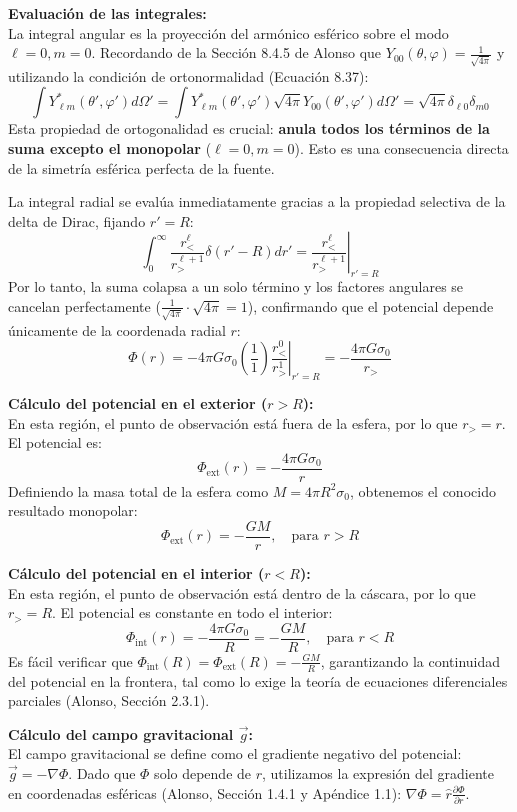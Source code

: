 \documentclass[a4paper]{article}
\begin{document}
\textbf{Evaluación de las integrales:} \\
La integral angular es la proyección del armónico esférico sobre el modo $\ell=0, m=0$. Recordando de la Sección 8.4.5 de Alonso que $Y_{00}(\theta, \varphi) = \frac{1}{\sqrt{4\pi}}$ y utilizando la condición de ortonormalidad (Ecuación 8.37):
$$
\int Y_{\ell m}^*(\theta', \varphi') d\Omega' = \int Y_{\ell m}^*(\theta', \varphi') \sqrt{4\pi} Y_{00}(\theta', \varphi') d\Omega' = \sqrt{4\pi} \delta_{\ell 0} \delta_{m 0}
$$
Esta propiedad de ortogonalidad es crucial: \textbf{anula todos los términos de la suma excepto el monopolar} ($\ell=0, m=0$). Esto es una consecuencia directa de la simetría esférica perfecta de la fuente. 

La integral radial se evalúa inmediatamente gracias a la propiedad selectiva de la delta de Dirac, fijando $r' = R$:
$$
\int_0^\infty \frac{r_{<}^\ell}{r_{>}^{\ell+1}} \delta(r' - R) dr' = \left. \frac{r_{<}^\ell}{r_{>}^{\ell+1}} \right|_{r'=R}
$$
Por lo tanto, la suma colapsa a un solo término y los factores angulares se cancelan perfectamente ($\frac{1}{\sqrt{4\pi}} \cdot \sqrt{4\pi} = 1$), confirmando que el potencial depende únicamente de la coordenada radial $r$:
$$
\Phi(r) = -4\pi G \sigma_0 \left( \frac{1}{1} \right) \left. \frac{r_{<}^0}{r_{>}^1} \right|_{r'=R} = -\frac{4\pi G \sigma_0}{r_{>}}
$$

\textbf{Cálculo del potencial en el exterior ($r > R$):} \\
En esta región, el punto de observación está fuera de la esfera, por lo que $r_{>} = r$. El potencial es:
$$
\Phi_{\text{ext}}(r) = -\frac{4\pi G \sigma_0}{r}
$$
Definiendo la masa total de la esfera como $M = 4\pi R^2 \sigma_0$, obtenemos el conocido resultado monopolar:
$$
\Phi_{\text{ext}}(r) = -\frac{GM}{r}, \quad \text{para } r > R
$$

\textbf{Cálculo del potencial en el interior ($r < R$):} \\
En esta región, el punto de observación está dentro de la cáscara, por lo que $r_{>} = R$. El potencial es constante en todo el interior:
$$
\Phi_{\text{int}}(r) = -\frac{4\pi G \sigma_0}{R} = -\frac{GM}{R}, \quad \text{para } r < R
$$
Es fácil verificar que $\Phi_{\text{int}}(R) = \Phi_{\text{ext}}(R) = -\frac{GM}{R}$, garantizando la continuidad del potencial en la frontera, tal como lo exige la teoría de ecuaciones diferenciales parciales (Alonso, Sección 2.3.1).

\textbf{Cálculo del campo gravitacional $\vec{g}$:} \\
El campo gravitacional se define como el gradiente negativo del potencial: $\vec{g} = -\nabla \Phi$. Dado que $\Phi$ solo depende de $r$, utilizamos la expresión del gradiente en coordenadas esféricas (Alonso, Sección 1.4.1 y Apéndice 1.1): $\nabla \Phi = \hat{r} \frac{\partial \Phi}{\partial r}$.
\end{document}
